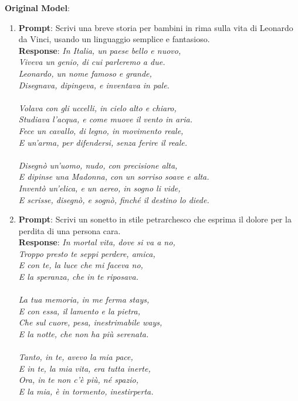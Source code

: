 \documentclass{article}
\begin{document}
	\textbf{Original Model}:
	\begin{enumerate}
	
		\item 
		\textbf{Prompt}: Scrivi una breve storia per bambini in rima sulla vita di Leonardo da Vinci, usando un linguaggio semplice e fantasioso.\\
		\textbf{Response}: \textit{In Italia, un paese bello e nuovo,\\Viveva un genio, di cui parleremo a due.\\Leonardo, un nome famoso e grande,\\Disegnava, dipingeva, e inventava in pale.\\\\Volava con gli uccelli, in cielo alto e chiaro,\\Studiava l'acqua, e come muove il vento in aria.\\Fece un cavallo, di legno, in movimento reale,\\E un'arma, per difendersi, senza ferire il reale.\\\\Disegnò un'uomo, nudo, con precisione alta,\\E dipinse una Madonna, con un sorriso soave e alta.\\Inventò un'elica, e un aereo, in sogno li vide,\\E scrisse, disegnò, e sognò, finché il destino lo diede.}
		
		\item 
		\textbf{Prompt}:  Scrivi un sonetto in stile petrarchesco che esprima il dolore per la perdita di una persona cara.\\
		\textbf{Response}: \textit{In mortal vita, dove si va a no,\\Troppo presto te seppi perdere, amica,\\E con te, la luce che mi faceva no,\\E la speranza, che in te riposava.\\\\La tua memoria, in me ferma stays,\\E con essa, il lamento e la pietra,\\Che sul cuore, pesa, inestrimabile ways,\\E la notte, che non ha più serenata.\\\\Tanto, in te, avevo la mia pace,\\E in te, la mia vita, era tutta inerte,\\Ora, in te non c'è più, né spazio,\\E la mia, è in tormento, inestirperta.}
		

\end{enumerate}
\end{document}
